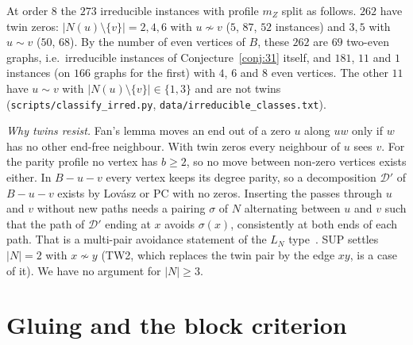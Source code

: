 \documentclass[11pt]{amsart}
\theoremstyle{definition}
\begin{document}
At order $8$ the $273$ irreducible instances with profile $m_Z$ split as follows. $262$ have twin zeros:
$|N(u)\setminus\{v\}|=2,4,6$ with $u\not\sim v$ ($5$, $87$, $52$ instances) and $3,5$ with $u\sim v$ ($50$, $68$).
By the number of even vertices of $B$, these $262$ are $69$ two-even graphs, i.e.\ irreducible instances of
Conjecture~\ref{conj:31} itself, and $181$, $11$ and $1$ instances (on $166$ graphs for the first) with $4$, $6$ and $8$ even vertices. The
other $11$ have $u\sim v$ with $|N(u)\setminus\{v\}|\in\{1,3\}$ and are not twins (\texttt{scripts/classify\_irred.py}, \texttt{data/irreducible\_classes.txt}).

\emph{Why twins resist.} Fan's lemma moves an end out of a zero $u$ along $uw$ only if $w$ has no other
end-free neighbour. With twin zeros every neighbour of $u$ sees $v$. For the parity profile no vertex has
$b\ge2$, so no move between non-zero vertices exists either. In $B-u-v$ every vertex keeps its degree
parity, so a decomposition $\mathcal D'$ of $B-u-v$ exists by Lov\'asz or PC with no zeros. Inserting the passes
through $u$ and $v$ without new paths needs a pairing $\sigma$ of $N$ alternating between $u$ and $v$ such
that the path of $\mathcal D'$ ending at $x$ avoids $\sigma(x)$, consistently at both ends of each path. That is a
multi-pair avoidance statement of the $L_N$ type~\cite{CR}. SUP settles $|N|=2$ with $x\not\sim y$ (TW2, which
replaces the twin pair by the edge $xy$, is a case of it). We have no argument for $|N|\ge3$.

\section{Gluing and the block criterion}\label{sec:BC}
\end{document}
